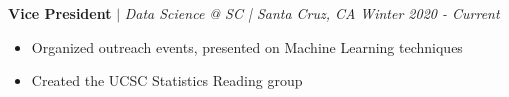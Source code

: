 \documentclass[margin]{res}
\begin{document}
\begin{resume}
    \textbf{Vice President} $\mid$ \textit{Data Science @ SC | Santa Cruz, CA} \hfill {\sl Winter 2020 - Current}
    \begin{itemize}
        \item Organized outreach events, presented on Machine Learning techniques
        \item Created the UCSC Statistics Reading group
    \end{itemize} \vspace*{-10pt}

\end{resume}
\end{document}
